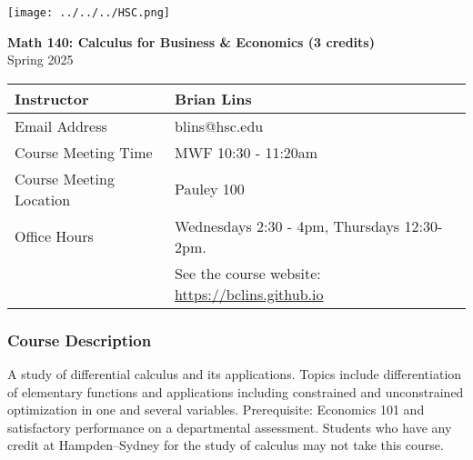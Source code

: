 \documentclass[10pt]{article}
\begin{document}
\noindent
%


\begin{center}
\texttt{[image: ../../../HSC.png]} 
\bigskip

\textbf{Math 140: Calculus for Business \& Economics (3 credits)} \\
Spring 2025
\end{center}

\noindent
\begin{tabular}{|l|l|}
\hline
Instructor & Brian Lins \\ \hline
Email Address & blins@hsc.edu \\ \hline
Course Meeting Time & MWF 10:30 - 11:20am \\ \hline
Course Meeting Location & Pauley 100 \\ \hline
Office Hours & Wednesdays 2:30 - 4pm, Thursdays 12:30-2pm. \\ 
& See the course website: \url{https://bclins.github.io} ~ \\ \hline
\end{tabular}

\subsubsection*{Course Description}

A study of differential calculus and its applications. Topics include differentiation of elementary functions and applications including constrained and unconstrained optimization in one and several variables. Prerequisite: Economics 101 and satisfactory performance on a departmental assessment. Students who have any credit at Hampden–Sydney for the study of calculus may not take this course.
\end{document}
